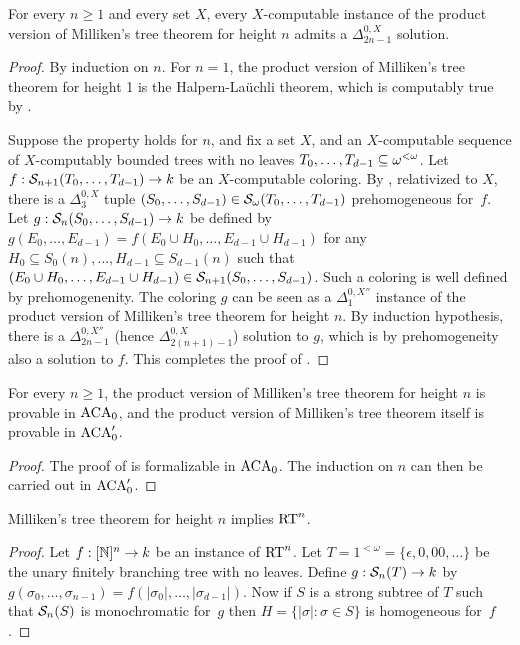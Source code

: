 \begin{theorem}\label{thm:milliken-arithmetic}
For every $n \geq 1$ and every set $X$, every $X$-computable instance of the product version of Milliken's tree theorem for height $n$ admits a $\Delta^{0,X}_{2n-1}$ solution.
\end{theorem}
\begin{proof}
By induction on $n$. For $n = 1$, the product version of Milliken's tree theorem for height 1 is the Halpern-La\"{u}chli theorem, which is computably true by .

Suppose the property holds for $n$, and fix a set $X$,
and an $X$-computable sequence of $X$-computably bounded trees with no leaves $T_0, \dots, T_{d-1} \subseteq {\omega^{<\omega}}$. 
Let $f: \mathcal{S}_{n+1}({T_0, \dots, T_{d-1}}) \to k$ be an $X$-computable coloring.
By , relativized to $X$, there is a $\Delta^{0,X}_3$ tuple $(S_0, \dots, S_{d-1}) \in \mathcal{S}_{\omega}({T_0, \dots,\allowbreak T_{d-1}})$ prehomogeneous for~$f$.
Let $g: \mathcal{S}_{n}({S_0, \dots, S_{d-1}}) \to k$ be defined by
$g( E_0, \dots, E_{d-1} ) = f( E_0 \cup H_0, \dots, E_{d-1} \cup H_{d-1} )$ for any $H_0 \subseteq S_0(n), \dots, H_{d-1} \subseteq S_{d-1}(n)$
such that $( E_0 \cup H_0, \dots, E_{d-1} \cup H_{d-1} ) \in \mathcal{S}_{n+1}({S_0, \dots, S_{d-1}})$. Such a coloring is well defined by prehomogenenity.
The coloring $g$ can be seen as a $\Delta^{0,X''}_1$ instance of the product version of Milliken's tree theorem for height $n$.
By induction hypothesis, there is a $\Delta^{0, X''}_{2n-1}$ (hence $\Delta^{0,X}_{2(n+1)-1}$) solution to $g$, which is by prehomogeneity also a solution to $f$. This completes the proof of .
\end{proof}


\begin{corollary}\label{thm:milliken-aca}
  For every $n \geq 1$, the product version of Milliken's tree theorem for height $n$ is provable in
  $\mathrm{ACA}_0$, and the product version of Milliken's tree theorem itself is provable in $\mathrm{ACA}'_0$.
\end{corollary}
\begin{proof}
The proof of  is formalizable in $\mathrm{ACA}_0$.
The induction on $n$ can then be carried out in $\mathrm{ACA}'_0$.
\end{proof}



\begin{theorem}\label{thm:milliken-rt}
  Milliken's tree theorem for height $n$ implies $\mathrm{RT}^{n}_{}$.
\end{theorem}
\begin{proof}
Let $f: [\mathbb{N}]^n \to k$ be an instance of $\mathrm{RT}^{n}_{}$.
Let $T = 1^{<\omega} = \{\epsilon, 0, 00, \dots \}$ be the unary finitely branching tree with no leaves. Define $g: \mathcal{S}_{n}({T}) \to k$ by $g(\sigma_0, \dots, \sigma_{n-1}) = f(|\sigma_0|, \dots, |\sigma_{d-1}|)$. 
Now if $S$ is a strong subtree of $T$ such that $\mathcal{S}_{n}({S})$
is monochromatic for~$g$ then $H = \{|\sigma|: \sigma \in S \}$ is homogeneous for~$f$.
\end{proof}

